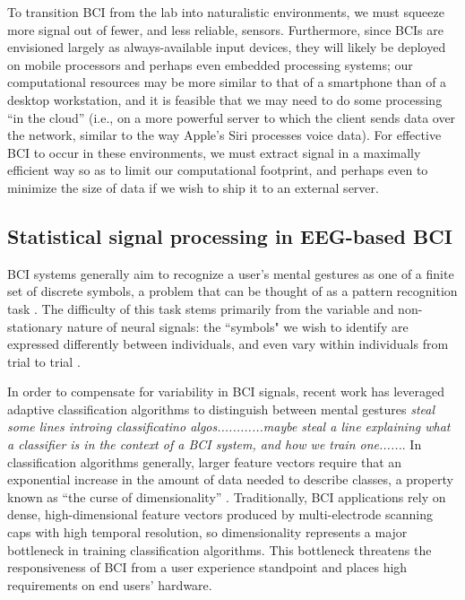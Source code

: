 To transition BCI from the lab into naturalistic environments, we must squeeze more signal out of fewer, and less reliable, sensors. Furthermore, since BCIs are envisioned largely as always-available input devices, they will likely be deployed on mobile processors and perhaps even embedded processing systems; our computational resources may be more similar to that of a smartphone than of a desktop workstation, and it is feasible that we may need to do some processing ``in the cloud'' (i.e., on a more powerful server to which the client sends data over the network, similar to the way Apple's Siri processes voice data). For effective BCI to occur in these environments, we must extract signal in a maximally efficient way so as to limit our computational footprint, and perhaps even to minimize the size of data if we wish to ship it to an external server.

\subsection{Statistical signal processing in EEG-based BCI}

\noindent BCI systems generally aim to recognize a user's mental gestures as one of a finite set of discrete symbols, a problem that can be thought of as a pattern recognition task \cite{lotte_review_2007}. The difficulty of this task stems primarily from the variable and non-stationary nature of neural signals: the ``symbols" we wish to identify are expressed differently between individuals, and even vary within individuals from trial to trial \cite{vidaurre_fully_2006,vidaurre_machine-learning-based_2011}. 

In order to compensate for variability in BCI signals, recent work has leveraged adaptive classification algorithms to distinguish between mental gestures \cite{lotte_review_2007,vidaurre_machine-learning-based_2011} \textit{steal some lines introing classificatino algos............maybe steal a line explaining what a classifier is in the context of a BCI system, and how we train one......}.  In classification algorithms generally, larger feature vectors require that an exponential increase in the amount of data needed to describe classes, a property known as ``the curse of dimensionality'' \cite{jain_statistical_2000,raudys_small_1991}. Traditionally, BCI applications rely on dense, high-dimensional feature vectors produced by multi-electrode scanning caps with high temporal resolution, so dimensionality represents a major bottleneck in training classification algorithms. This bottleneck threatens the responsiveness of BCI from a user experience standpoint and places high requirements on end users' hardware.

